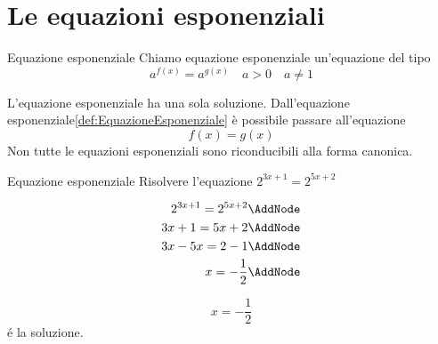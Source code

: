 \chapter{Le equazioni esponenziali}
\label{cha:LeEquazioniEsponenziali}
\begin{definizionet}{Equazione esponenziale}{}\label{def:EquazioneEsponenziale}
Chiamo equazione esponenziale un'equazione del tipo \[a^{f(x)}=a^{g(x)}\quad a>0\quad  a\neq1 \]
\end{definizionet}
L'equazione esponenziale ha una sola soluzione. 
Dall'equazione esponenziale\nobs\vref{def:EquazioneEsponenziale} è possibile passare all'equazione \[f(x)=g(x) \]Non tutte le equazioni esponenziali sono riconducibili alla forma canonica.
\begin{esempiot}{Equazione esponenziale}{}
	Risolvere l'equazione $2^{3x+1}=2^{5x+2} $
\end{esempiot}
\begin{NodesList}%
\begin{align*}
2^{3x+1}=2^{5x+2}\AddNode\\
3x+1=5x+2\AddNode\\
3x-5x=2-1\AddNode\\
x=-\dfrac{1}{2}\AddNode
\end{align*}
%
%
%
\end{NodesList}
\[x=-\dfrac{1}{2}\]
\'{e} la soluzione.

